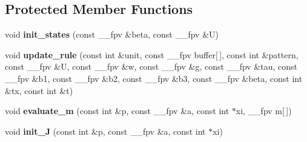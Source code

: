 \subsection*{Protected Member Functions}
\begin{DoxyCompactItemize}
\item 
void {\bfseries init\+\_\+states} (const \+\_\+\+\_\+fpv \&beta, const \+\_\+\+\_\+fpv \&U)\hypertarget{classLC__PNet_a2925dc1c225646f4be3e466383812f14}{}\label{classLC__PNet_a2925dc1c225646f4be3e466383812f14}

\item 
void {\bfseries update\+\_\+rule} (const int \&unit, const \+\_\+\+\_\+fpv buffer\mbox{[}$\,$\mbox{]}, const int \&pattern, const \+\_\+\+\_\+fpv \&U, const \+\_\+\+\_\+fpv \&w, const \+\_\+\+\_\+fpv \&g, const \+\_\+\+\_\+fpv \&tau, const \+\_\+\+\_\+fpv \&b1, const \+\_\+\+\_\+fpv \&b2, const \+\_\+\+\_\+fpv \&b3, const \+\_\+\+\_\+fpv \&beta, const int \&tx, const int \&t)\hypertarget{classLC__PNet_aef7091aa9525fb95c3f1df19f801b535}{}\label{classLC__PNet_aef7091aa9525fb95c3f1df19f801b535}

\item 
void {\bfseries evaluate\+\_\+m} (const int \&p, const \+\_\+\+\_\+fpv \&a, const int $\ast$xi, \+\_\+\+\_\+fpv m\mbox{[}$\,$\mbox{]})\hypertarget{classLC__PNet_a184fb2c6b021c7a814954e9750347b1c}{}\label{classLC__PNet_a184fb2c6b021c7a814954e9750347b1c}

\item 
void {\bfseries init\+\_\+J} (const int \&p, const \+\_\+\+\_\+fpv \&a, const int $\ast$xi)\hypertarget{classLC__PNet_a22278003507e1871152e4024002a7ff9}{}\label{classLC__PNet_a22278003507e1871152e4024002a7ff9}

\end{DoxyCompactItemize}
